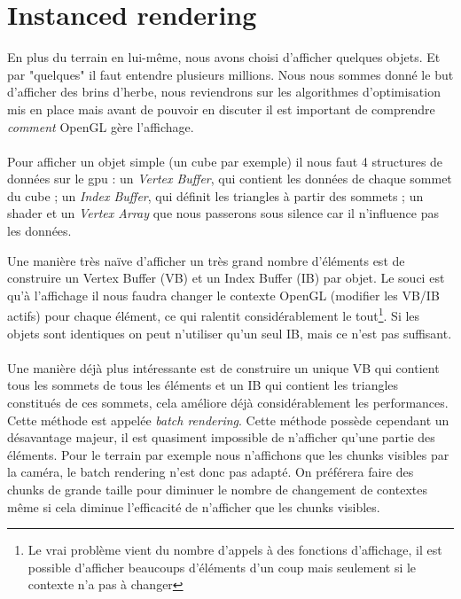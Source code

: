 \documentclass{EPUProjetDi}
\begin{document}
\section{Instanced rendering}
\label{sec:instanced_rendering}

En plus du terrain en lui-même, nous avons choisi d'afficher quelques objets. Et par "quelques" il faut entendre plusieurs millions. Nous nous sommes donné le but d'afficher des brins d'herbe, nous reviendrons sur les algorithmes d'optimisation mis en place mais avant de pouvoir en discuter il est important de comprendre \textit{comment} OpenGL gère l'affichage.
\paragraph{}
Pour afficher un objet simple (un cube par exemple) il nous faut 4 structures de données sur le gpu : un \textit{Vertex Buffer}, qui contient les données de chaque sommet du cube ; un \textit{Index Buffer}, qui définit les triangles à partir des sommets ; un shader et un \textit{Vertex Array} que nous passerons sous silence car il n'influence pas les données.

Une manière très naïve d'afficher un très grand nombre d'éléments est de construire un Vertex Buffer (VB) et un Index Buffer (IB) par objet. Le souci est qu'à l'affichage il nous faudra changer le contexte OpenGL (modifier les VB/IB actifs) pour chaque élément, ce qui ralentit considérablement le tout\footnote{Le vrai problème vient du nombre d'appels à des fonctions d'affichage, il est possible d'afficher beaucoups d'éléments d'un coup mais seulement si le contexte n'a pas à changer}.
Si les objets sont identiques on peut n'utiliser qu'un seul IB, mais ce n'est pas suffisant.

\paragraph{}
Une manière déjà plus intéressante est de construire un unique VB qui contient tous les sommets de tous les éléments et un IB qui contient les triangles constitués de ces sommets, cela améliore déjà considérablement les performances. Cette méthode est appelée \textit{batch rendering}.
Cette méthode possède cependant un désavantage majeur, il est quasiment impossible de n'afficher qu'une partie des éléments. Pour le terrain par exemple nous n'affichons que les chunks visibles par la caméra, le batch rendering n'est donc pas adapté. On préférera faire des chunks de grande taille pour diminuer le nombre de changement de contextes même si cela diminue l'efficacité de n'afficher que les chunks visibles.
\end{document}
